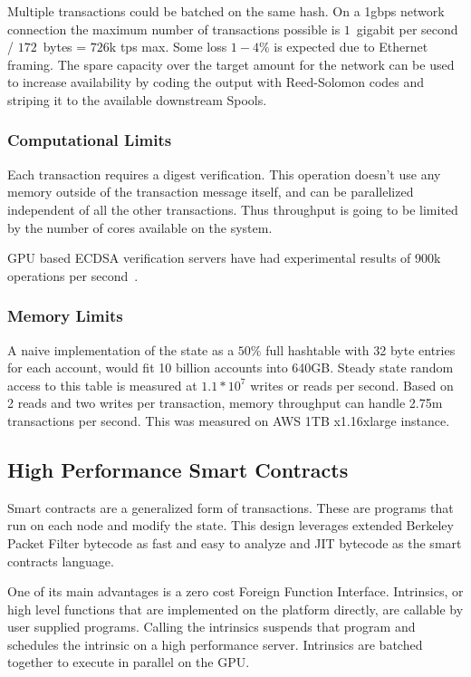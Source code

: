 \documentclass[12pt]{article}
\begin{document}
Multiple transactions could be batched on the same hash. On a 1gbps network connection the maximum number of transactions possible is $1$~gigabit per second / $172$~bytes = $726$k tps max. Some loss $1-4\%$ is expected due to Ethernet framing. The spare capacity over the target amount for the network can be used to increase availability by coding the output with Reed-Solomon codes and striping it to the available downstream Spools.
\subsubsection{Computational Limits}
Each transaction requires a digest verification. This operation doesn’t use any memory outside of the transaction message itself, and can be parallelized independent of all the other transactions. Thus throughput is going to be limited by the number of cores available on the system.

GPU based ECDSA verification servers have had experimental results of 900k operations per second~\cite{gpuecc}.
\subsubsection{Memory Limits}
A naive implementation of the state as a \(50\%\) full hashtable with 32 byte entries for each account, would fit 10 billion accounts into 640GB. Steady state random access to this table is measured at \(1.1 * 10^7\) writes or reads per second. Based on 2 reads and two writes per transaction, memory throughput can handle 2.75m transactions per second. This was measured on AWS 1TB x1.16xlarge instance.

\subsection{High Performance Smart Contracts}\label{sec:smartcontracts}

Smart contracts are a generalized form of transactions. These are programs that run on each node and modify the state. This design leverages extended Berkeley Packet Filter bytecode as fast and easy to analyze and JIT bytecode as the smart contracts language.

One of its main advantages is a zero cost Foreign Function Interface. Intrinsics, or high level functions that are implemented on the platform directly, are callable by user supplied programs. Calling the intrinsics suspends that program and schedules the intrinsic on a high performance server. Intrinsics are batched together to execute in parallel on the GPU.
\end{document}
